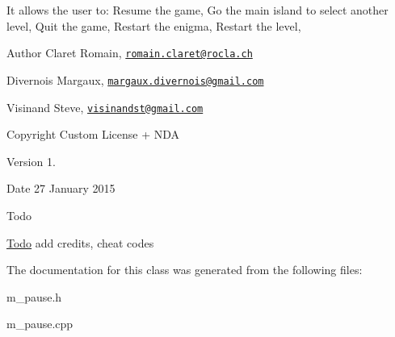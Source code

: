 It allows the user to\+: Resume the game, Go the main island to select another level, Quit the game, Restart the enigma, Restart the level, \begin{DoxyAuthor}{Author}
Claret Romain, \href{mailto:romain.claret@rocla.ch}{\tt romain.\+claret@rocla.\+ch} 

Divernois Margaux, \href{mailto:margaux.divernois@gmail.com}{\tt margaux.\+divernois@gmail.\+com} 

Visinand Steve, \href{mailto:visinandst@gmail.com}{\tt visinandst@gmail.\+com} 
\end{DoxyAuthor}
\begin{DoxyCopyright}{Copyright}
Custom License + N\+D\+A 
\end{DoxyCopyright}
\begin{DoxyVersion}{Version}
1. 
\end{DoxyVersion}
\begin{DoxyDate}{Date}
27 January 2015 
\end{DoxyDate}
\begin{DoxyRefDesc}{Todo}
\item[\hyperlink{todo__todo000010}{Todo}]add credits, cheat codes \end{DoxyRefDesc}


The documentation for this class was generated from the following files\+:\begin{DoxyCompactItemize}
\item 
m\+\_\+pause.\+h\item 
m\+\_\+pause.\+cpp\end{DoxyCompactItemize}
